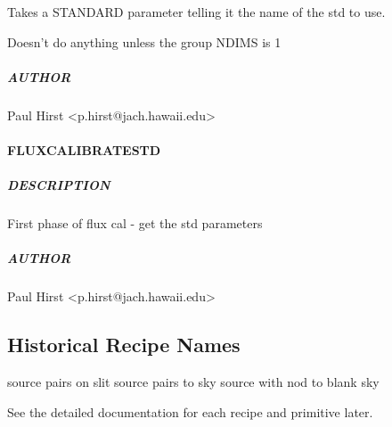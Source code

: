 \documentclass[twoside,11pt]{article}
\renewcommand{\_}{\texttt{\symbol{95}}}
\begin{document}
Takes a STANDARD parameter telling it the name of the std to use.



Doesn't do anything unless the group NDIMS is 1

\subparagraph*{AUTHOR\label{_ALIGN_SPECTRUM_TO_STD__AUTHOR}}

Paul Hirst <p.hirst@jach.hawaii.edu>

\paragraph*{\_FLUX\_CALIBRATE\_STD\_\label{_FLUX_CALIBRATE_STD_}}



\subparagraph*{DESCRIPTION\label{_FLUX_CALIBRATE_STD__DESCRIPTION}}

First phase of flux cal - get the std parameters

\subparagraph*{AUTHOR\label{_FLUX_CALIBRATE_STD__AUTHOR}}

Paul Hirst <p.hirst@jach.hawaii.edu>


\subsection{Historical Recipe Names}

source pairs on slit
source pairs to sky
source with nod to blank sky

See the detailed documentation for each recipe and primitive later.


\end{document}
